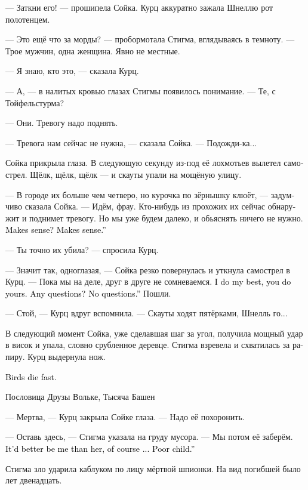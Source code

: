 \documentclass[a4paper,12pt,fleqn]{book}\usepackage{cooltooltips}\usepackage{polyglossia}\setdefaultlanguage[babelshorthands=true]{russian}\setotherlanguage{english}\defaultfontfeatures{Ligatures=TeX,Mapping=tex-text} \usepackage{xcolor}\definecolor{lightgray}{HTML}{bbbbbb}\color{lightgray}\newcommand{\ml}[3]{\textenglish{\textcolor{black}{#3}}}
\newcommand{\textspace}{\vspace{1em}{\centering\Large\bfseries<...>\par}\vspace{1em}}
\begin{document}
--- Заткни его! --- прошипела Сойка.
Курц аккуратно зажала Шнеллю рот полотенцем.

--- Это ещё что за морды? --- пробормотала Стигма, вглядываясь в темноту.
--- Трое мужчин, одна женщина.
Явно не местные.

--- Я знаю, кто это, --- сказала Курц.

--- А, --- в налитых кровью глазах Стигмы появилось понимание.
--- Те, с Тойфельстурма?

--- Они.
Тревогу надо поднять.

--- Тревога нам сейчас не нужна, --- сказала Сойка.
--- Подожди-ка...

Сойка прикрыла глаза.
В следующую секунду из-под её лохмотьев вылетел самострел.
Щёлк, щёлк, щёлк --- и скауты упали на мощёную улицу.

--- В городе их больше чем четверо, но курочка по зёрнышку клюёт, --- задумчиво сказала Сойка.
--- Идём, фрау.
Кто-нибудь из прохожих их сейчас обнаружит и поднимет тревогу.
Но мы уже будем далеко, и обьяснять ничего не нужно.
\ml{$0$}
{Разумно?}
{Makes sense?}
\ml{$0$}
{Разумно.}
{Makes sense.''}

--- Ты точно их убила? --- спросила Курц.

--- Значит так, одноглазая, --- Сойка резко повернулась и уткнула самострел в Курц.
--- Пока мы на деле, друг в друге не сомневаемся.
\ml{$0$}
{Я делаю всё в лучшем виде, и ты тоже.}
{I do my best, you do yours.}
\ml{$0$}
{Вопросы?}
{Any questions?}
\ml{$0$}
{Вопросов нет.}
{No questions.''}
Пошли.

--- Стой, --- Курц вдруг вспомнила.
--- Скауты ходят пятёрками, Шнелль го...

В следующий момент Сойка, уже сделавшая шаг за угол, получила мощный удар в висок и упала, словно срубленное деревце.
Стигма взревела и схватилась за рапиру.
Курц выдернула нож.

\textspace

\epigraph
{\ml{$0$}
{Птицы умирают быстро.}
{Birds die fast.}}
{Пословица Друзы Вольке, Тысяча Башен}

--- Мертва, --- Курц закрыла Сойке глаза.
--- Надо её похоронить.

--- Оставь здесь, --- Стигма указала на груду мусора.
--- Мы потом её заберём.
\ml{$0$}
{Лучше бы меня завалили, конечно...}
{It'd better be me than her, of course ...}
\ml{$0$}
{Жалко девчонку.}
{Poor child.''}

Стигма зло ударила каблуком по лицу мёртвой шпионки.
На вид погибшей было лет двенадцать.
\end{document}
